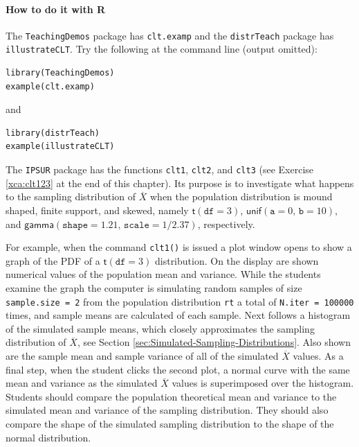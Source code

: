 \documentclass[captions=tableheading]{scrbook}
\begin{document}
\paragraph*{How to do it with \textsf{R}}

The \texttt{TeachingDemos} package \cite{Snowteachingdemos} has \texttt{clt.examp} and the \texttt{distrTeach} \cite{Ruckdescheldistr} package has \texttt{illustrateCLT}. Try the following at the command line (output omitted):

\begin{verbatim}
library(TeachingDemos)
example(clt.examp)
\end{verbatim}
and

\begin{verbatim}
library(distrTeach)
example(illustrateCLT)
\end{verbatim}

The \texttt{IPSUR}  package has the functions \texttt{clt1}, \texttt{clt2}, and \texttt{clt3} (see Exercise \ref{xca:clt123} at the end of this chapter). Its purpose is to investigate what happens to the sampling distribution of \(\overline{X}\) when the population distribution is mound shaped, finite support, and skewed, namely \(\mathsf{t}(\mathtt{df}=3)\), \(\mathsf{unif}(\mathtt{a}=0,\,\mathtt{b}=10)\), and \(\mathsf{gamma}(\mathtt{shape}=1.21,\,\mathtt{scale}=1/2.37)\), respectively. 

For example, when the command \texttt{clt1()}  is issued a plot window opens to show a graph of the PDF of a \(\mathsf{t}(\mathtt{df}=3)\) distribution. On the display are shown numerical values of the population mean and variance. While the students examine the graph the computer is simulating random samples of size \texttt{sample.size = 2} from the population distribution \texttt{rt} a total of \texttt{N.iter = 100000} times, and sample means are calculated of each sample. Next follows a histogram of the simulated sample means, which closely approximates the sampling distribution of \(\overline{X}\), see Section \ref{sec:Simulated-Sampling-Distributions}. Also shown are the sample mean and sample variance of all of the simulated  \( \overline{X} \) values. As a final step, when the student clicks the second plot, a normal curve with the same mean and variance as the simulated \( \overline{X} \) values is superimposed over the histogram. Students should compare the population theoretical mean and variance to the simulated mean and variance of the sampling distribution. They should also compare the shape of the simulated sampling distribution to the shape of the normal distribution.
\end{document}
